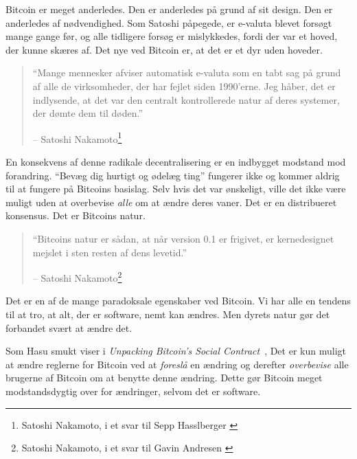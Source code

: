\documentclass[paper=6in:9in,pagesize=pdftex,headinclude=on,footinclude=on,12pt]{scrbook}
\begin{document}
Bitcoin er meget anderledes. Den er anderledes på grund af sit design. Den er anderledes af nødvendighed. Som Satoshi påpegede, er e-valuta blevet forsøgt mange gange før, og alle tidligere forsøg er mislykkedes, fordi der var et hoved, der kunne skæres af. Det nye ved Bitcoin er, at det er et dyr uden hoveder.\begin{quotation}\begin{samepage} \enquote{Mange mennesker afviser automatisk e-valuta som en tabt sag på grund af alle de virksomheder, der har fejlet siden 1990'erne. Jeg håber, det er indlysende, at det var den centralt kontrollerede natur af deres systemer, der dømte dem til døden.} \begin{flushright} -- Satoshi Nakamoto\footnote{Satoshi Nakamoto, i et svar til Sepp Hasslberger \cite{satoshi-centralized-nature}}
\end{flushright}\end{samepage}\end{quotation}

En konsekvens af denne radikale decentralisering er en indbygget modstand mod forandring. \enquote{Bevæg dig hurtigt og ødelæg ting} fungerer ikke og kommer aldrig til at fungere på Bitcoins basislag. Selv hvis det var ønskeligt, ville det ikke være muligt uden at overbevise \textit{alle} om at ændre deres vaner. Det er en distribueret konsensus. Det er Bitcoins natur.\begin{quotation}\begin{samepage} \enquote{Bitcoins natur er sådan, at når version 0.1 er frigivet, er kernedesignet mejslet i sten resten af dens levetid.} \begin{flushright} -- Satoshi Nakamoto\footnote{Satoshi Nakamoto, i et svar til Gavin Andresen \cite{satoshi-centralized-nature}}
\end{flushright}\end{samepage}\end{quotation}

Det er en af de mange paradoksale egenskaber ved Bitcoin. Vi har alle en tendens til at tro, at alt, der er software, nemt kan ændres. Men dyrets natur gør det forbandet svært at ændre det.

Som Hasu smukt viser i \textit{Unpacking Bitcoin’s Social Contract}~\cite{social-contract}, Det er kun muligt at ændre reglerne for Bitcoin ved at \textit{foreslå} en ændring og derefter \textit{overbevise} alle brugerne af Bitcoin om at benytte denne ændring. Dette gør Bitcoin meget modstandsdygtig over for ændringer, selvom det er software.
\end{document}
